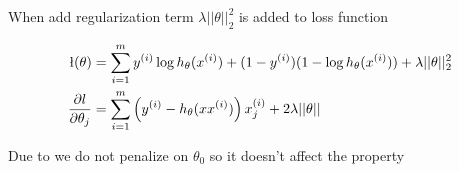 \begin{answer}
	
	When add regularization term $\lambda ||\theta||_{2}^{2}$ is added to loss function
	
	\begin{align}
		\l(\theta) &= \sum_{i=1}^{m} y^{(i)}\log h_{\theta}(x^{(i)}) + (1-y^{(i)})(1-\log h_{\theta} (x^{(i)})) + \lambda||\theta||_{2}^{2} \\
		\frac{\partial l}{\partial \theta_{j}} &= \sum_{i=1}^{m} \left( y^{(i)} - h_{\theta}(xx^{(i)}) \right) x^{(i)}_{j} + 2\lambda ||\theta||
	\end{align}
	
	Due to we do not penalize on $\theta_{0}$ so it doesn't affect the property
\end{answer}
